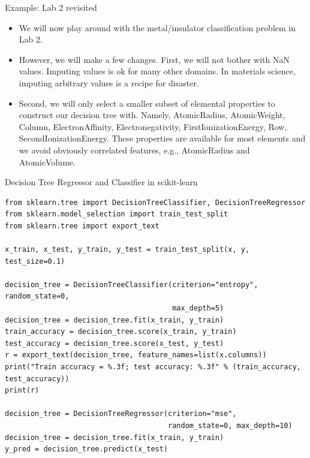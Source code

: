 \documentclass{beamer}
\begin{document}
\begin{frame}{Example: Lab 2 revisited}
    \begin{itemize}
        \item We will now play around with the metal/insulator classification problem in Lab 2.
        \item However, we will make a few changes. First, we will not bother with NaN values. Imputing values is ok for many other domains. In materials science, imputing arbitrary values is a recipe for disaster.
        \item Second, we will only select a smaller subset of elemental properties to construct our decision tree with. Namely, AtomicRadius, AtomicWeight, Column, ElectronAffinity, Electronegativity, FirstIonizationEnergy, Row, SecondIonizationEnergy. These properties are available for most elements and we avoid obviously correlated features, e.g., AtomicRadius and AtomicVolume.
    \end{itemize}
\end{frame}


\begin{frame}[fragile]{Decision Tree Regressor and Classifier in scikit-learn}
\begin{verbatim}
from sklearn.tree import DecisionTreeClassifier, DecisionTreeRegressor
from sklearn.model_selection import train_test_split
from sklearn.tree import export_text

x_train, x_test, y_train, y_test = train_test_split(x, y, test_size=0.1)

decision_tree = DecisionTreeClassifier(criterion="entropy", random_state=0, 
                                       max_depth=5)
decision_tree = decision_tree.fit(x_train, y_train)
train_accuracy = decision_tree.score(x_train, y_train)
test_accuracy = decision_tree.score(x_test, y_test)
r = export_text(decision_tree, feature_names=list(x.columns))
print("Train accuracy = %.3f; test accuracy: %.3f" % (train_accuracy, test_accuracy))
print(r)

decision_tree = DecisionTreeRegressor(criterion="mse", 
                                      random_state=0, max_depth=10)
decision_tree = decision_tree.fit(x_train, y_train)
y_pred = decision_tree.predict(x_test)
\end{verbatim}
\end{frame}
\end{document}
